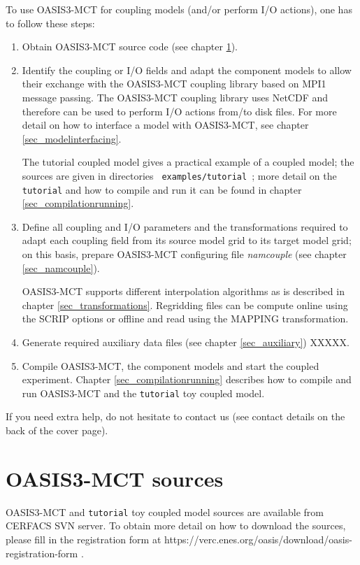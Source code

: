 To use OASIS3-MCT for coupling models (and/or perform I/O
actions), one has to follow these steps:
\begin{enumerate}
\item Obtain OASIS3-MCT source code (see chapter \ref{sec_Obtaining}).
\item Identify the coupling or I/O fields and adapt the component
  models to allow their exchange with the OASIS3-MCT coupling library based on MPI1
  message passing.
  The OASIS3-MCT coupling library uses NetCDF and therefore can be used to perform I/O actions
  from/to disk files.  For more detail on how to interface a model
  with OASIS3-MCT, see chapter \ref{sec_modelinterfacing}.

The tutorial coupled model gives a practical example of a coupled
model; the sources are given in directories {\tt
  examples/tutorial }; more detail on the {\tt tutorial} and
how to compile and run it can be found in chapter
\ref{sec_compilationrunning}.

\item Define all coupling and I/O parameters and the transformations
  required to adapt each coupling field from its source model grid to
  its target model grid; on this basis, prepare OASIS3-MCT configuring file 
  {\it namcouple} (see chapter \ref{sec_namcouple}). 
  
  OASIS3-MCT supports different interpolation algorithms as is described in
  chapter \ref{sec_transformations}.  Regridding files can be compute
  online using the SCRIP options or offline and read using the MAPPING
  transformation.

\item Generate required auxiliary data files (see chapter
  \ref{sec_auxiliary}) XXXXX.
\item Compile OASIS3-MCT, the component models and start the coupled
  experiment. Chapter \ref{sec_compilationrunning} describes how to
  compile and run OASIS3-MCT and the {\tt tutorial} toy coupled model.

\end{enumerate}

If you need extra help, do not hesitate to contact us (see contact
details on the back of the cover page).

\section{OASIS3-MCT sources}
\label{sec_Obtaining}
OASIS3-MCT and {\tt tutorial} toy coupled model sources are available from CERFACS SVN server. To obtain more detail on how to download
the sources, please fill in the registration form at \newline 
https://verc.enes.org/oasis/download/oasis-registration-form .

